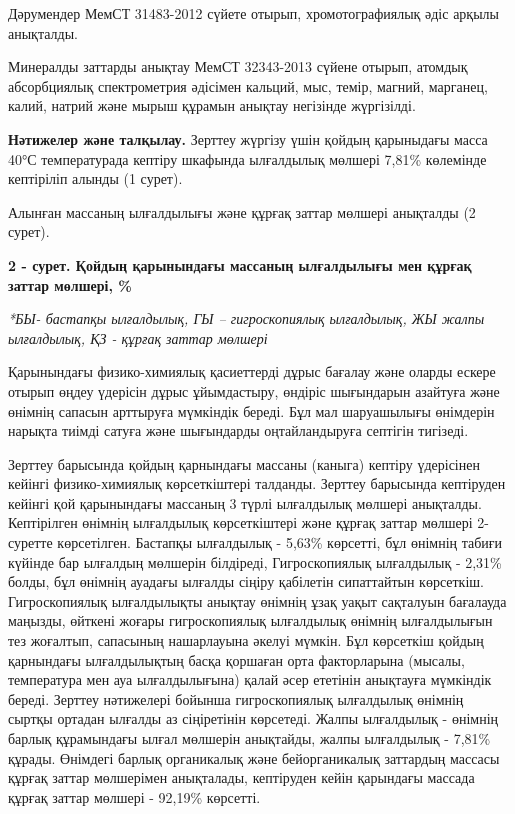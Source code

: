 \begin{multicols}{2}
Дәрумендер МемСТ 31483-2012 сүйете отырып, хромотографиялық әдіс арқылы
анықталды.

Минералды заттарды анықтау МемСТ 32343-2013 сүйене отырып, атомдық
абсорбциялық спектрометрия әдісімен кальций, мыс, темір, магний,
марганец, калий, натрий және мырыш құрамын анықтау негізінде жүргізілді.

{\bfseries Нәтижелер және талқылау.} Зерттеу жүргізу үшін қойдың қарыныдағы
масса 40°С температурада кептіру шкафында ылғалдылық мөлшері 7,81\%
көлемінде кептіріліп алынды (1 сурет).
\end{multicols}

\figend

Алынған массаның ылғалдылығы және құрғақ заттар мөлшері анықталды (2
сурет).

{\bfseries 2 - сурет. Қойдың қарынындағы массаның ылғалдылығы мен құрғақ
заттар мөлшері, \%}

\emph{*БЫ- бастапқы ылғалдылық, ГЫ -- гигроскопиялық ылғалдылық, ЖЫ
жалпы ылғалдылық, ҚЗ - құрғақ заттар мөлшері}

Қарынындағы физико-химиялық қасиеттерді дұрыс бағалау және оларды ескере
отырып өңдеу үдерісін дұрыс ұйымдастыру, өндіріс шығындарын азайтуға
және өнімнің сапасын арттыруға мүмкіндік береді. Бұл мал шаруашылығы
өнімдерін нарықта тиімді сатуға және шығындарды оңтайландыруға септігін
тигізеді.

Зерттеу барысында қойдың қарнындағы массаны (каныга) кептіру үдерісінен
кейінгі физико-химиялық көрсеткіштері талданды. Зерттеу барысында
кептіруден кейінгі қой қарынындағы массаның 3 түрлі ылғалдылық мөлшері
анықталды. Кептірілген өнімнің ылғалдылық көрсеткіштері және құрғақ
заттар мөлшері 2- суретте көрсетілген. Бастапқы ылғалдылық - 5,63\%
көрсетті, бұл өнімнің табиғи күйінде бар ылғалдың мөлшерін білдіреді,
Гигроскопиялық ылғалдылық - 2,31\% болды, бұл өнімнің ауадағы ылғалды
сіңіру қабілетін сипаттайтын көрсеткіш. Гигроскопиялық ылғалдылықты
анықтау өнімнің ұзақ уақыт сақталуын бағалауда маңызды, өйткені жоғары
гигроскопиялық ылғалдылық өнімнің ылғалдылығын тез жоғалтып, сапасының
нашарлауына әкелуі мүмкін. Бұл көрсеткіш қойдың қарнындағы ылғалдылықтың
басқа қоршаған орта факторларына (мысалы, температура мен ауа
ылғалдылығына) қалай әсер ететінін анықтауға мүмкіндік береді. Зерттеу
нәтижелері бойынша гигроскопиялық ылғалдылық өнімнің сыртқы ортадан
ылғалды аз сіңіретінін көрсетеді. Жалпы ылғалдылық - өнімнің барлық
құрамындағы ылғал мөлшерін анықтайды, жалпы ылғалдылық - 7,81\% құрады.
Өнімдегі барлық органикалық және бейорганикалық заттардың массасы құрғақ
заттар мөлшерімен анықталады, кептіруден кейін қарындағы массада құрғақ
заттар мөлшері - 92,19\% көрсетті.

